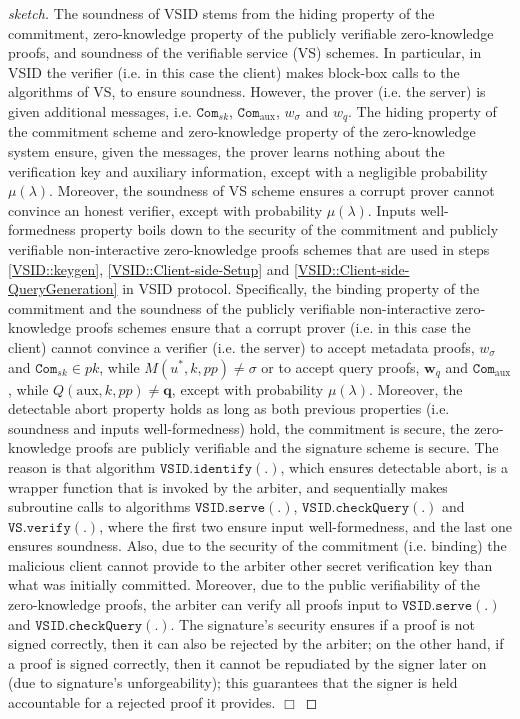 
\begin{proof}[sketch] The soundness  of VSID  stems  from the hiding property of the commitment, zero-knowledge property of the publicly verifiable zero-knowledge proofs, and soundness of  the  verifiable service (VS) schemes. In particular, in VSID the verifier (i.e. in this case the client) makes block-box calls to the algorithms of   VS, to ensure soundness. However, the prover (i.e.  the server) is given  additional messages, i.e.   $\mathtt{Com}_{\scriptscriptstyle sk}$,  $\mathtt{Com}_{\scriptscriptstyle \text{aux}}$, $w_{\scriptscriptstyle\sigma}$ and $w_{\scriptscriptstyle q}$. The hiding property of the commitment scheme and zero-knowledge property of the zero-knowledge system ensure, given the messages, the prover learns nothing about the verification key and auxiliary information, except with a negligible probability $\mu(\lambda)$. Moreover, the soundness of VS scheme ensures a corrupt prover cannot convince an honest verifier, except with  probability $\mu(\lambda)$.   Inputs well-formedness property boils down to the security of the commitment and publicly verifiable non-interactive zero-knowledge proofs   schemes that are used in steps \ref{VSID::keygen}, \ref{VSID::Client-side-Setup} and \ref{VSID::Client-side-QueryGeneration} in VSID protocol. Specifically,  the binding property of the commitment and the soundness of the publicly verifiable non-interactive zero-knowledge proofs schemes  ensure that a corrupt prover (i.e. in this case the client) cannot convince a verifier (i.e. the server) to accept metadata proofs, $w_{\scriptscriptstyle\sigma}$ and $\mathtt{Com}_{\scriptscriptstyle sk}\in pk$, while  $M(u^{\scriptscriptstyle *},k,{pp})\neq \sigma $ or to accept query proofs, $\bm{w}_{\scriptscriptstyle q}$ and $\mathtt{Com}_{\scriptscriptstyle \text{aux}}$, while $Q(\text{aux},k,{pp})\neq \bm{q}$, except with  probability $\mu(\lambda)$.  Moreover, the detectable abort property holds as long as both previous properties (i.e. soundness and inputs well-formedness) hold, the commitment is secure, the zero-knowledge proofs are publicly verifiable and the signature scheme is secure. The reason is that algorithm $\mathtt{VSID.identify}(.)$, which ensures detectable abort, is a wrapper function that is invoked by the arbiter, and  sequentially makes subroutine calls to algorithms  $\mathtt{VSID.serve}(.)$,  $\mathtt{VSID.checkQuery}(.)$ and $\mathtt{VS.verify}(.)$,   where the first two ensure input well-formedness, and the last one ensures soundness. Also, due to the security of the commitment (i.e. binding) the malicious client cannot provide to the arbiter other secret verification key than what  was initially committed. Moreover, due to the public verifiability of the zero-knowledge proofs, the arbiter can verify all proofs input to $\mathtt{VSID.serve}(.)$ and $\mathtt{VSID.checkQuery}(.)$. The signature's security ensures if a proof is not signed correctly, then it can also be rejected by the arbiter; on the other hand, if a proof is signed correctly, then  it cannot be repudiated by the signer later on (due to signature's unforgeability); this guarantees that the signer is held accountable for a rejected proof it provides.
  \hfill\(\Box\)\end{proof}
  
  
  
  
  
  